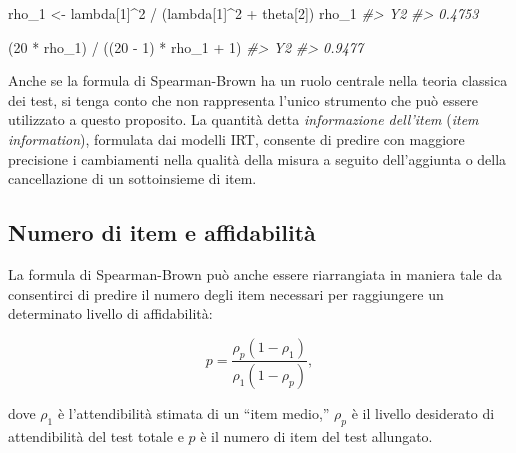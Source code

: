 \documentclass[
  11pt,
]{krantz}
\makeatletter
\newenvironment{Shaded}{\begin{snugshade}}{\end{snugshade}}
\newcommand{\CommentTok}[1]{\textcolor[rgb]{0.37,0.37,0.37}{\textit{#1}}}
\newcommand{\DecValTok}[1]{\textcolor[rgb]{0.06,0.06,0.06}{#1}}
\newcommand{\NormalTok}[1]{#1}
\newcommand{\OtherTok}[1]{\textcolor[rgb]{0.37,0.37,0.37}{#1}}
\newcommand{\SpecialCharTok}[1]{\textcolor[rgb]{0,0,0}{#1}}
\newenvironment{kframe}{%
\medskip{}
\setlength{\fboxsep}{.8em}
 \def\at@end@of@kframe{}%
 \ifinner\ifhmode%
  \def\at@end@of@kframe{\end{minipage}}%
  \begin{minipage}{\columnwidth}%
 \fi\fi%
 \def\FrameCommand##1{\hskip\@totalleftmargin \hskip-\fboxsep
 \colorbox{shadecolor}{##1}\hskip-\fboxsep
     \hskip-\linewidth \hskip-\@totalleftmargin \hskip\columnwidth}%
 \MakeFramed {\advance\hsize-\width
   \@totalleftmargin\z@ \linewidth\hsize
   \@setminipage}}%
 {\par\unskip\endMakeFramed%
 \at@end@of@kframe}
\renewenvironment{Shaded}{\begin{kframe}}{\end{kframe}}
\theoremstyle{definition}
\theoremstyle{definition}
\theoremstyle{definition}
\theoremstyle{definition}
\theoremstyle{remark}
\makeatother
\begin{document}
\begin{Shaded}
\begin{Highlighting}[]
\NormalTok{rho\_1 }\OtherTok{\textless{}{-}}\NormalTok{ lambda[}\DecValTok{1}\NormalTok{]}\SpecialCharTok{\^{}}\DecValTok{2} \SpecialCharTok{/}\NormalTok{ (lambda[}\DecValTok{1}\NormalTok{]}\SpecialCharTok{\^{}}\DecValTok{2} \SpecialCharTok{+}\NormalTok{ theta[}\DecValTok{2}\NormalTok{])}
\NormalTok{rho\_1}
\CommentTok{\#\textgreater{}     Y2 }
\CommentTok{\#\textgreater{} 0.4753}
\end{Highlighting}
\end{Shaded}

\begin{Shaded}
\begin{Highlighting}[]
\NormalTok{(}\DecValTok{20} \SpecialCharTok{*}\NormalTok{ rho\_1) }\SpecialCharTok{/}\NormalTok{ ((}\DecValTok{20} \SpecialCharTok{{-}} \DecValTok{1}\NormalTok{) }\SpecialCharTok{*}\NormalTok{ rho\_1 }\SpecialCharTok{+} \DecValTok{1}\NormalTok{)}
\CommentTok{\#\textgreater{}     Y2 }
\CommentTok{\#\textgreater{} 0.9477}
\end{Highlighting}
\end{Shaded}

Anche se la formula di Spearman-Brown ha un ruolo centrale nella teoria classica dei test, si tenga conto che non rappresenta l'unico strumento che può essere utilizzato a questo proposito. La quantità detta \emph{informazione dell'item} (\emph{item information}), formulata dai modelli IRT, consente di predire con maggiore precisione i cambiamenti nella qualità della misura a seguito dell'aggiunta o della cancellazione di un sottoinsieme di item.

\hypertarget{numero-di-item-e-affidabilituxe0}{%
\subsection{Numero di item e affidabilità}\label{numero-di-item-e-affidabilituxe0}}

La formula di Spearman-Brown può anche essere riarrangiata in maniera tale da consentirci di predire il numero degli item necessari per raggiungere un determinato livello di affidabilità:

\begin{equation}
p = \frac{\rho_p (1-\rho_1)}{\rho_1(1-\rho_p)}, 
\label{eq:s-b-inv}
\end{equation}

dove \(\rho_1\) è l'attendibilità stimata di un ``item medio,'' \(\rho_p\) è il livello desiderato di attendibilità del test totale e \(p\) è il numero di item del test allungato.
\end{document}
